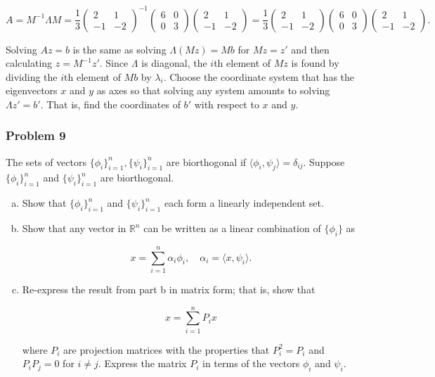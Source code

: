 \documentclass{article}
\begin{document}
$$
A = M^{-1} \Lambda M = \frac{1}{3}
\begin{pmatrix}
2 & 1 \\ -1 & -2
\end{pmatrix}^{-1}
\begin{pmatrix}
6 & 0 \\ 0 & 3
\end{pmatrix}
\begin{pmatrix}
2 & 1 \\ -1 & -2
\end{pmatrix}
= \frac{1}{3}\begin{pmatrix}
2 & 1 \\ -1 & -2
\end{pmatrix}
\begin{pmatrix}
6 & 0 \\ 0 & 3
\end{pmatrix}
\begin{pmatrix}
2 & 1 \\ -1 & -2
\end{pmatrix}.
$$

Solving $Az = b$ is the same as solving $\Lambda (Mz) = Mb$ for $Mz = z'$ and then calculating $z = M^{-1}z'$. Since $\Lambda$ is diagonal, the $i$th element of $Mz$ is found by dividing the $i$th element of $Mb$ by $\lambda_i$. Choose the coordinate system that has the eigenvectors $x$ and $y$ as axes so that solving any system amounts to solving $\Lambda z' = b'$. That is, find the coordinates of $b'$ with respect to $x$ and $y$. 

\subsubsection*{Problem 9}

The sets of vectors $\{\phi_i \}_{i=1}^n, \{\psi_i \}_{i=1}^n$ are biorthogonal if $\langle \phi_i , \psi_j \rangle = \delta_{ij}$. Suppose $\{\phi_i \}_{i=1}^n$ and $\{\psi_i \}_{i=1}^n$ are biorthogonal.

\begin{enumerate}[a.]
\item Show that $\{\phi_i \}_{i=1}^n$ and $\{\psi_i \}_{i=1}^n$ each form a linearly independent set.

\item
Show that any vector in $\mathbb{R}^n$ can be written as a linear combination of $\{\phi_i\}$ as

$$
x = \sum_{i=1}^n \alpha_i \phi_i, \quad \alpha_i = \langle x, \psi_i\rangle.
$$

\item
Re-express the result from part b in matrix form; that is, show that

$$
x = \sum_{i=1}^n P_i x
$$

where $P_i$ are projection matrices with the properties that $P_i^2 = P_i$ and $P_iP_j = 0$ for $i \neq j$. Express the matrix $P_i$ in terms of the vectors $\phi_i$ and $\psi_i$. 
\end{enumerate}
\end{document}
